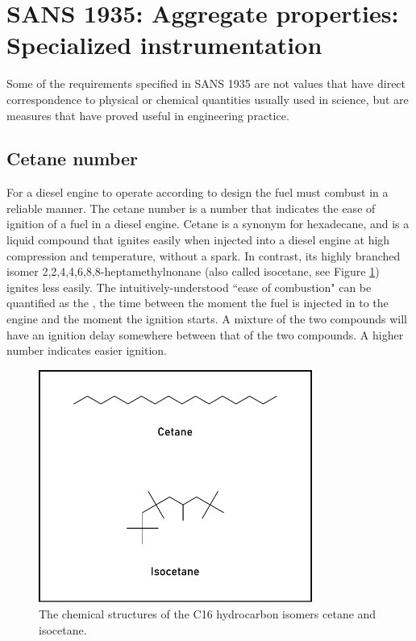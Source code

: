 \section[SANS 1935: Aggregate properties: Specialized in\-stru\-mentation]{SANS
1935: Aggregate properties: \\ Specialized in\-stru\-mentation}

Some of the requirements specified in SANS 1935 are not values that have direct
correspondence to physical or chemical quantities usually used in science, but
are measures that have proved useful in engineering practice.

\subsection{Cetane number}

For a diesel engine to operate according to design the fuel must combust in a
reliable manner. The cetane number is a number that indicates the ease of
ignition of a fuel in a diesel engine. Cetane is a synonym for hexadecane, and
is a liquid compound that ignites easily when injected into a diesel engine at
high compression and temperature, without a spark. In contrast, its highly
branched isomer 2,2,4,4,6,8,8-heptamethylnonane (also called isocetane, see
Figure \ref{fig:Cetane}) ignites less easily. The intuitively-understood ``ease
of combustion" can be quantified as the , the time
between the moment the fuel is injected in to the engine and the moment the
ignition starts. A mixture of the two compounds will have an ignition delay
somewhere between that of the two compounds. A higher number indicates easier
ignition.

\begin{figure}
\centering
\includegraphics[width=0.8\textwidth]{Figures/cetane.pdf}
\decoRule

\caption[Cetane and isocetane]{The chemical structures of the C16 hydrocarbon
isomers cetane and isocetane.}
\label{fig:Cetane}
\end{figure}

